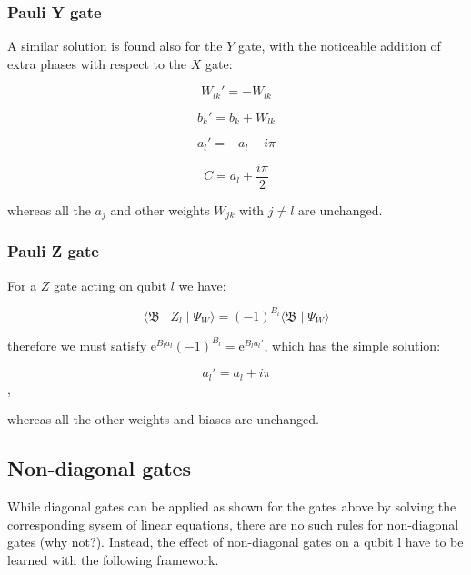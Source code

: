 \subsubsection{Pauli Y gate}
A similar solution is found also for the $Y$ gate, with the noticeable addition of extra phases
with respect to the $X$ gate:

\begin{equation}
   W_{lk}\prime = -W_{lk}
\end{equation}

\begin{equation}
   b_{k}\prime = b_{k} + W_{lk}
\end{equation}

\begin{equation}
   a_{l}\prime = -a_{l} + i \pi
\end{equation}

\begin{equation}
   C = a_{l} + \frac{i \pi}{2}
\end{equation}

whereas all the $a_{j}$ and other weights $W_{jk}$ with $j \neq l$ are unchanged.

\subsubsection{Pauli Z gate}
For a $Z$ gate acting on qubit $l$ we have:

\begin{equation}
    \langle \mathfrak{B} \mid Z_{l} \mid \Psi_{W}  \rangle = 
    (-1)^{B_{l}} \langle \mathfrak{B} \mid \Psi_{W} \rangle
\end{equation}

therefore we must satisfy $\mathrm{e}^{B_{l}a_{l}}(-1)^{B_{l}} = \mathrm{e}^{B_{l}a_{l}\prime}$, which
has the simple solution:

\begin{equation}
    a_{l}\prime = a_{l} + i \pi
\end{equation},

whereas all the other weights and biases are unchanged.

\subsection{Non-diagonal gates}
While diagonal gates can be applied as shown for the gates above by solving the corresponding sysem of linear equations, 
there are no such rules for non-diagonal gates (why not?). Instead, the effect of non-diagonal gates on a qubit l have to be 
learned with the following framework.

